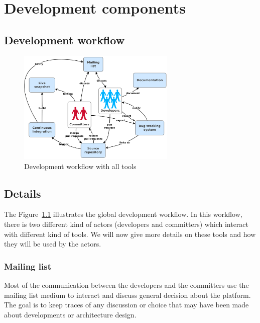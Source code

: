 \chapter{Development components}
\label{ch:development-components}

\section{Development workflow}
\label{sec:development-workflow}

\begin{figure}
\centering
\includegraphics[width=0.67\textwidth]{images/development-workflow.png}
\caption{Development workflow with all tools}
\label{fig:development-workflow}
\end{figure}

\section{Details}
\label{sec:details}

The Figure~\ref{fig:development-workflow} illustrates the global development workflow.
In this workflow, there is two different kind of actors (developers and committers) which interact with different kind of tools.
We will now give more details on these tools and how they will be used by the actors.

\subsection{Mailing list}
\label{sec:mailing-list}

Most of the communication between the developers and the committers use the mailing list medium to interact and discuss general decision about the platform.
The goal is to keep traces of any discussion or choice that may have been made about developments or architecture design.

